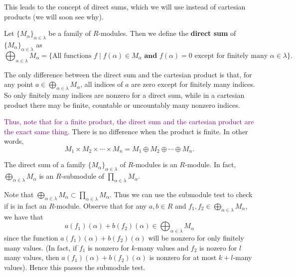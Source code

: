 This leads to the concept of direct sums, which we will use
instead of cartesian products (we will soon see why).

\begin{definition}
    Let $\{M_\alpha\}_{\alpha \in \lambda}$ be a family of
    $R$-modules. Then we define the \textbf{direct sum} of
    $\{M_\alpha\}_{\alpha \in \lambda}$ as 
    \[
        \bigoplus_{\alpha \in \lambda}M_\alpha = \{\text{All functions } f \mid f(\alpha) \in M_\alpha \textbf{ and } f(\alpha) = 0 \text{ except for finitely many } \alpha \in \lambda\}.
    \]
\end{definition}

The only
difference between the direct sum and the cartesian product is that, for any point
$\displaystyle a \in \bigoplus_{\alpha \in \lambda} M_\alpha$, all
indices of $a$ are zero except for finitely many indices. So
only finitely many indices are nonzero for a direct sum, while
in a cartesian product there may be finite, countable or
uncountably many nonzero indices.


\textcolor{purple}{Thus, note that for a finite product, the direct sum
and the cartesian product are the exact same thing}. There is no
difference when the product is finite. In other words, 
\[
    M_1 \times M_2 \times \cdots \times M_n = M_1 \oplus M_2 \oplus \cdots \oplus M_n.
\]

\begin{proposition}
    The direct sum of a family $\{M_\alpha\}_{\alpha \in
    \lambda}$ of $R$-modules is an $R$-module. In fact,
    $\displaystyle \bigoplus_{\alpha \in 
    \lambda} M_\alpha$ is an $R$-submodule of $\displaystyle \prod_{\alpha \in \lambda} M_{\alpha}$.
\end{proposition}

\begin{prf}
    Note that $\displaystyle \bigoplus_{\alpha \in \lambda}
    M_\alpha \subset \prod_{\alpha \in \lambda}M_\alpha$. Thus we
    can use the submodule test to check if is in fact an
    $R$-module. Observe that for any $a, b \in R$ and
    $\displaystyle f_1, f_2
    \in \bigoplus_{\alpha \in \lambda}M_{\alpha}$, we have that 
    \[
        a(f_1)(\alpha) + b(f_2)(\alpha) \in \bigoplus_{\alpha \in \lambda}M_{\alpha} 
    \]
    since the function $a(f_1)(\alpha) + b(f_2)(\alpha)$ will be
    nonzero for only finitely many values. (In fact, if $f_1$ is
    nonzero for $k$-many values and $f_2$ is nozero for $l$ many
    values, then $a(f_1)(\alpha) + b(f_2)(\alpha)$ is nonzero for
    at most $k + l$-many values). Hence this passes the submodule
    test.
\end{prf}

